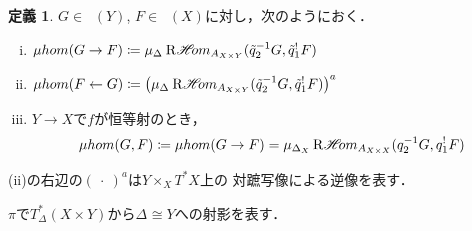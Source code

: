 \documentclass[leqno, 10pt, a4paper, dvipdfmx]{jsarticle}
\theoremstyle{definition}
\numberwithin{equation}{section}
\newcommand{\Dompb}{\mathop{\mathsf{D}^\mathrm{b}}\nolimits}
\newcommand{\HOM}{\mathop{\mathscr{H}\hspace{-2pt}om}\nolimits}%
\newcommand{\RHOM}{\mathop{\mathrm{R}\hspace{-1.5pt}\HOM}\nolimits}
\newcommand{\blk}{\mathord{\ \cdot\ }}
\newcommand{\tpb}[1][]{\mathbin{\mathop{\times}\nolimits_{#1}}}
\theoremstyle{mystyle}
\newtheorem{DFN}[AXM]{定義}
\newcommand{\cotb}[1][]{T^{\ast}{#1}}
\newcommand{\muhom}{\mu hom}
\newcommand{\diag}[1][]{\Delta_{#1}}
\begin{document}
\begin{DFN}
  \(G\in\Dompb(Y)\), \(F\in\Dompb(X)\)に対し，次のようにおく．
  \begin{enumerate}[(i)]
    \item \(\muhom(G\to F)\coloneqq\mu_{\diag[]}\RHOM_{A_{X\times Y}}(\tilde{q}_2^{-1}G,\tilde{q}_1^{!}F)\)
    \item \(\muhom(F\leftarrow G)\coloneqq\left(\mu_{\diag[]}\RHOM_{A_{X\times Y}}(\tilde{q}_2^{-1}G,\tilde{q}_1^{!}F)\right)^{a}\)
    \item \(Y\to X\)で\(f\)が恒等射のとき，\[
      \muhom(G,F)
      \coloneqq\muhom(G\to F)
      =\mu_{\diag[X]}\RHOM_{A_{X\times X}}({q}_2^{-1}G,{q}_1^{!}F)
    \]
  \end{enumerate}
\end{DFN}
(ii)の右辺の\((\blk)^{a}\)は\(Y\tpb[X]\cotb[X]\)上の
対蹠写像による逆像を表す．

\(\pi\)で\(T^{\ast}_{\diag[]}(X\times Y)\)から\(\diag[]\cong Y\)への射影を表す．
\end{document}
